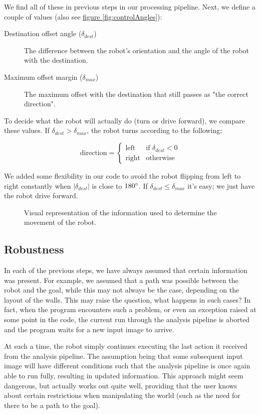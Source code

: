 \documentclass[10pt,twocolumn]{scrartcl}
\newcommand{\fref}[1]{\hyperref[#1]{figure \vref{#1}}}
\begin{document}
We find all of these in previous steps in our processing pipeline. Next, we define a couple of values (also see \fref{fig:controlAngles}):

\begin{description}
\item[Destination offset angle ($\delta_{dest}$)] The difference between the robot's orientation and the angle of the robot with the destination.
\item[Maximum offset margin ($\delta_{max}$)] The maximum offset with the destination that still passes as "the correct direction".
\end{description}

To decide what the robot will actually do (turn or drive forward), we compare these values. If $\delta_{dest} > \delta_{max}$, the robot turns according to the following:

\[
\textrm{direction} =
\begin{cases}
\textrm{left} & \textrm{if } \delta_{dest} < 0 \\
\textrm{right} & \textrm{otherwise}
\end{cases}
\]

We added some flexibility in our code to avoid the robot flipping from left to right constantly when $\lvert \delta_{dest}\rvert$ is close to $180\degree$.
If $\delta_{dest} \leq \delta_{max}$ it's easy; we just have the robot drive forward.

\begin{figure}
	\centering
	
	\caption{\small Visual representation of the information used to determine the movement of the robot.}
	\label{fig:controlAngles}
\end{figure}

\subsection{Robustness}
In each of the previous steps, we have always assumed that certain information was present. For example, we assumed that a path was possible between the robot and the goal, while this may not always be the case, depending on the layout of the walls. This may raise the question, what happens in such cases? In fact, when the program encounters such a problem, or even an exception raised at some point in the code, the current run through the analysis pipeline is aborted and the program waits for a new input image to arrive.

At such a time, the robot simply continues executing the last action it received from the analysis pipeline. The assumption being that some subsequent input image will have different conditions such that the analysis pipeline is once again able to run fully, resulting in updated information. This approach might seem dangerous, but actually works out quite well, providing that the user knows about certain restrictions when manipulating the world (such as the need for there to be a path to the goal).
\end{document}
